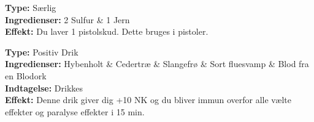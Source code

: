 \begin{særlig*}[Krudt]
\textbf{Type:} Særlig\\
\textbf{Ingredienser:} 2 Sulfur \& 1 Jern\\
\textbf{Effekt:} Du laver 1 pistolskud. Dette bruges i pistoler.\\
\end{særlig*}

\begin{drik*}
\textbf{Type:} Positiv Drik\\
\textbf{Ingredienser:} Hybenholt \& Cedertræ \& Slangefrø \& Sort fluesvamp \& Blod fra en Blodork\\
\textbf{Indtagelse:} Drikkes\\
\textbf{Effekt:} Denne drik giver dig +10 NK og du bliver immun overfor alle vælte effekter og paralyse effekter i 15 min.\\
\end{drik*}